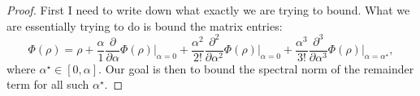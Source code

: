 \documentclass{article}
\newcommand{\parens}[1]{\left( #1 \right)}
\newcommand{\norm}[1]{\left| \left| #1 \right| \right|}
\begin{document}
\begin{proof}
    First I need to write down what exactly we are trying to bound. What we are essentially trying to do is bound the matrix entries:
\begin{equation}
    \Phi(\rho) = \rho + \frac{\alpha}{1} \frac{\partial}{\partial \alpha} \Phi(\rho) \bigg|_{\alpha = 0} + \frac{\alpha^2}{2!} \frac{\partial^2}{\partial \alpha^2} \Phi(\rho) \bigg|_{\alpha = 0} + \frac{\alpha^3}{3!} \frac{\partial^3}{\partial \alpha^3} \Phi(\rho) \bigg|_{\alpha = \alpha^\star},\label{eq:remExpress}
\end{equation}
where $\alpha^\star \in [0, \alpha]$. Our goal is then to bound the spectral norm of the remainder term for all such $\alpha^\star$.




\end{proof}
\end{document}
